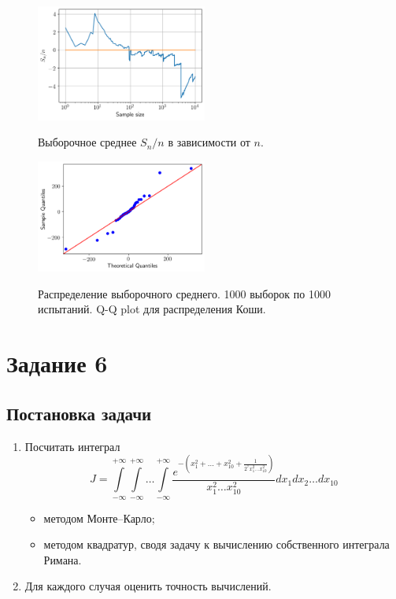 \documentclass[12pt, a4paper]{article} %
\begin{document}
\begin{figure}[H]
\begin{multicols}{2}
        \centering
        \includegraphics[width=0.5\textwidth]{figures/05_cmeans.png}
        \caption{Выборочное среднее $S_n / n$ в зависимости от $n$.}
        \label{fig:05_cmeans}
    \hfill 
        \centering
        \includegraphics[width=0.5\textwidth]{figures/05_cqq.png}
        \caption{Распределение выборочного среднего. 1000 выборок по 1000 испытаний. Q-Q plot для распределения Коши.}
        \label{fig:05_cqq}
\end{multicols}
\end{figure}

\section{Задание 6}
\subsection{Постановка задачи}
\begin{enumerate}
\item Посчитать интеграл
$$J = \int\limits_{-\infty}^{+\infty}\int\limits_{-\infty}^{+\infty}\ldots\int\limits_{-\infty}^{+\infty} \dfrac{e^{-\left(x_1^2 + \ldots + x_{10}^2 + \frac{1}{2^7x_1^2\ldots x_{10}^2}\right)}}{x_1^2\ldots x_{10}^2}dx_1dx_2\ldots dx_{10}$$
\begin{itemize}
	\item методом Монте--Карло;
	\item методом квадратур, сводя задачу к вычислению собственного интеграла Римана.
\end{itemize} 
\item Для каждого случая оценить точность вычислений.
\end{enumerate}
\end{document}
